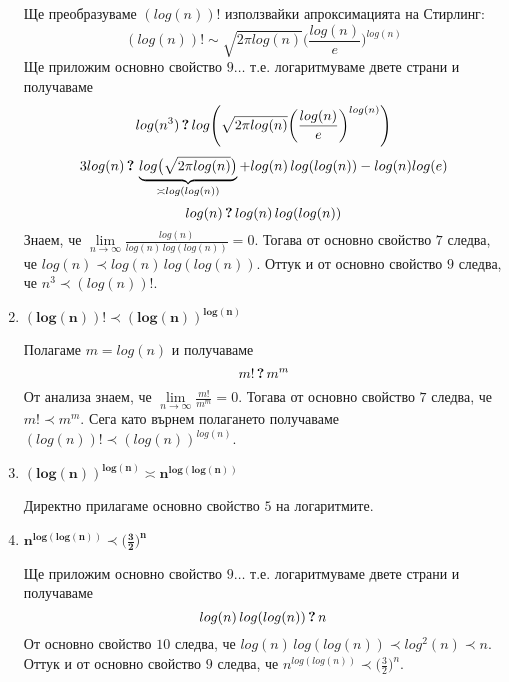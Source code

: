 \begin{solution}
\begin{enumerate}[label=\textbf{\arabic*.}]
		Ще преобразуваме $(log(n))!$ използвайки $\hyperref[cor:stirling]{\text{апроксимацията на Стирлинг}}$:
		\begin{equation*}
			(log(n))!\sim\sqrt{2\pi log(n)}\bigg(\frac{log(n)}{e}\bigg)^{log(n)}
		\end{equation*}
		Ще приложим основно свойство $\hyperref[mprop-1]{9}\dots$ т.е. логаритмуваме двете страни и получаваме
		\begin{equation*}
			log(n^3)\,\textbf?\,log\Bigg(\sqrt{2\pi log(n)}\bigg(\frac{log(n)}{e}\bigg)^{log(n)}\Bigg)
		\end{equation*}
		\begin{equation*}
			3log(n)\,\textbf?\,\underbrace{log\big(\sqrt{2\pi log(n)}\big)}_{\asymp log(log(n))}+log(n)\,log(log(n))-log(n)log(e)
		\end{equation*}
		\begin{equation*}
			log(n)\,\textbf?\,log(n)\,log(log(n))
		\end{equation*}
		Знаем, че $\lim\limits_{n\to\infty}\frac{log(n)}{log(n)\,log(log(n))}=0$. Тогава от основно свойство $\hyperref[mprop-1]{7}$ следва, че $log(n)\prec log(n)\,log(log(n))$. Оттук и от основно свойство $\hyperref[mprop-1]{9}$ следва, че $n^3\prec(log(n))!$.
		
		
		\vspace{0.2cm}
		\item $\bm{(log(n))!\prec(log(n))^{log(n)}}$
		
		Полагаме $m=log(n)$ и получаваме
		\begin{equation*}
			m!\,\textbf?\,m^m
		\end{equation*}
		От анализа знаем, че $\lim\limits_{n\to\infty}\frac{m!}{m^m}=0$. Тогава от основно свойство $\hyperref[mprop-1]{7}$ следва, че $m!\prec m^m$.
		Сега като върнем полагането получаваме $(log(n))!\prec(log(n))^{log(n)}$.
		
		
		\vspace{0.2cm}
		\item $\bm{(log(n))^{log(n)}\asymp n^{log(log(n))}}$
		
		Директно прилагаме основно свойство $\hyperref[fact-log-props]{5}$ на логаритмите.
		

		\vspace{0.2cm}
		\item $\bm{n^{log(log(n))}\prec \big(\frac{3}{2}\big)^n}$

		Ще приложим основно свойство $\hyperref[mprop-1]{9}\dots$ т.е. логаритмуваме двете страни и получаваме
		\begin{equation*}
			log(n)\,log(log(n))\,\textbf?\,n
		\end{equation*}
		От основно свойство $\hyperref[mprop-1]{10}$ следва, че $log(n)\,log(log(n))\prec log^2(n)\prec n$. Оттук и от основно свойство $\hyperref[mprop-1]{9}$ следва, че $n^{log(log(n))}\prec \big(\frac{3}{2}\big)^n$.
		

\end{enumerate}
\end{solution}
